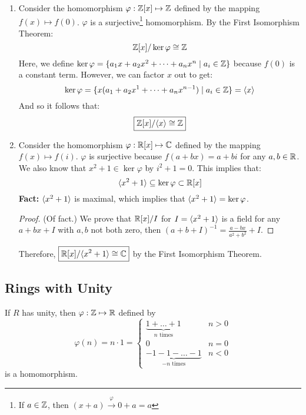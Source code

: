 \documentclass[letterpaper]{article}
\begin{document}
\begin{enumerate}
    \item Consider the homomorphism $\varphi: \mathbb{Z}[x] \mapsto \mathbb{Z}$ defined by the mapping $f(x) \mapsto f(0)$. $\varphi$ is a surjective\footnote{If $a \in \mathbb{Z}$, then $(x + a) \xrightarrow{\varphi} 0 + a = a$} homomorphism. By the First Isomorphism Theorem:
    \[\mathbb{Z}[x] / \ker\varphi \cong \mathbb{Z}\]
    Here, we define $\ker\varphi = \{a_1 x + a_2 x^2 + \dots + a_n x^n \mid a_i \in \mathbb{Z}\}$ because $f(0)$ is a constant term. However, we can factor $x$ out to get:
    \[\ker\varphi = \{x(a_1 + a_2 x^1 + \dots + a_n x^{n - 1}) \mid a_i \in \mathbb{Z}\} = \langle x \rangle\]
    And so it follows that:
    \[\boxed{\mathbb{Z}[x] / \langle x \rangle \cong \mathbb{Z}}\]


    \item Consider the homomorphism $\varphi: \mathbb{R}[x] \mapsto \mathbb{C}$ defined by the mapping $f(x) \mapsto f(i)$. $\varphi$ is surjective because $f(a + bx) = a + bi$ for any $a, b \in \mathbb{R}$. We also know that $x^2 + 1 \in \ker \varphi$ by $i^2 + 1 = 0$. This implies that: 
    \[\langle x^2 + 1 \rangle \subseteq \ker \varphi \subset \mathbb{R}[x]\]
    \textbf{Fact:} $\langle x^2 + 1 \rangle$ is maximal, which implies that $\langle x^2 + 1 \rangle = \ker \varphi$.
    \begin{mdframed}[]
        \begin{proof}
            (Of fact.) We prove that $\mathbb{R}[x] / I$ for $I = \langle x^2 + 1 \rangle$ is a field for any $a + bx + I$ with $a, b$ not both zero, then $(a + b + I)^{-1} = \frac{a - bx}{a^2 + b^2} + I$.
        \end{proof}
    \end{mdframed}
    Therefore, $\boxed{\mathbb{R}[x] / \langle x^2 + 1 \rangle \cong \mathbb{C}}$ by the First Isomorphism Theorem. 
\end{enumerate}

\subsection{Rings with Unity}
\begin{proposition}
    If $R$ has unity, then $\varphi: \mathbb{Z} \mapsto \mathbb{R}$ defined by
    \[\varphi(n) = n \cdot 1 = \begin{cases}
        \underbrace{1 + \dots + 1}_{n \text{ times}} & n > 0 \\ 
        0 & n = 0 \\ 
        \underbrace{-1 - 1 - \dots - 1}_{-n \text{ times}} & n < 0
    \end{cases}\]
    is a homomorphism.
\end{proposition}
\end{document}
